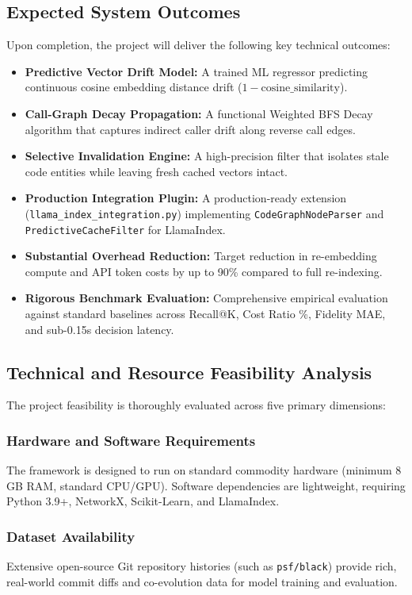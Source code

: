 \documentclass[conference]{IEEEtran}
\begin{document}
\subsection{Expected System Outcomes}
Upon completion, the project will deliver the following key technical outcomes:
\begin{itemize}
    \item \textbf{Predictive Vector Drift Model:} A trained ML regressor predicting continuous cosine embedding distance drift ($1 - \text{cosine\_similarity}$).
    \item \textbf{Call-Graph Decay Propagation:} A functional Weighted BFS Decay algorithm that captures indirect caller drift along reverse call edges.
    \item \textbf{Selective Invalidation Engine:} A high-precision filter that isolates stale code entities while leaving fresh cached vectors intact.
    \item \textbf{Production Integration Plugin:} A production-ready extension (\texttt{llama\_index\_integration.py}) implementing \texttt{CodeGraphNodeParser} and \texttt{PredictiveCacheFilter} for LlamaIndex.
    \item \textbf{Substantial Overhead Reduction:} Target reduction in re-embedding compute and API token costs by up to 90\% compared to full re-indexing.
    \item \textbf{Rigorous Benchmark Evaluation:} Comprehensive empirical evaluation against standard baselines across Recall@K, Cost Ratio \%, Fidelity MAE, and sub-0.15s decision latency.
\end{itemize}

\subsection{Technical and Resource Feasibility Analysis}
The project feasibility is thoroughly evaluated across five primary dimensions:

\subsubsection{Hardware and Software Requirements}
The framework is designed to run on standard commodity hardware (minimum 8 GB RAM, standard CPU/GPU). Software dependencies are lightweight, requiring Python 3.9+, NetworkX, Scikit-Learn, and LlamaIndex.

\subsubsection{Dataset Availability}
Extensive open-source Git repository histories (such as \texttt{psf/black}) provide rich, real-world commit diffs and co-evolution data for model training and evaluation.
\end{document}
